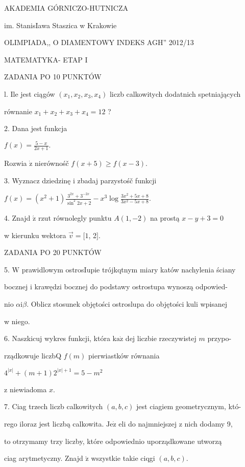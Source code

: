 \documentclass[a4paper,12pt]{article}
\begin{document}
AKADEMIA GÓRNICZO-HUTNICZA

im. StanisIawa Staszica w Krakowie

OLIMPIADA,, O DIAMENTOWY INDEKS AGH'' 2012/13

MATEMATYKA- ETAP I

ZADANIA PO 10 PUNKTÓW

l. Ile jest ciągów $(x_{1},x_{2},x_{3},x_{4})$ liczb calkowitych dodatnich spetniających

równanie $x_{1}+x_{2}+x_{3}+x_{4}=12$ ?

2. Dana jest funkcja

$f(x)=\displaystyle \frac{5-x}{2x+1}.$

Rozwia $\dot{\mathrm{z}}$ nierównośč $f(x+5)\geq f(x-3).$

3. Wyznacz dziedzinę i zbadaj parzystośč funkcji

$f(x)=(x^{2}+1)\displaystyle \frac{3^{2x}+3^{-2x}}{\sin^{2}2x+2}-x^{3}\log\frac{3x^{2}+5x+8}{3x^{2}-5x+8}.$

4. Znajd $\acute{\mathrm{z}}$ rzut równolegly punktu $A(1,-2)$ na prostą $x-y+3 = 0$

w kierunku wektora $\vec{v}=[1$, 2$].$

ZADANIA PO 20 PUNKTÓW

5. $\mathrm{W}$ prawidlowym ostrosIupie trójkqtnym miary katów nachylenia ściany

bocznej i krawędzi bocznej do podstawy ostrostupa wynoszą odpowied-

nio $\alpha \mathrm{i}\beta$. Oblicz stosunek objętości ostroslupa do objętości kuli wpisanej

w niego.

6. Naszkicuj wykres funkcji, która $\mathrm{k}\mathrm{a}\dot{\mathrm{z}}$ dej liczbie rzeczywistej $m$ przypo-

rządkowuje liczbQ $f(m)$ pierwiastków równania

$4^{|x|}+(m+1)2^{|x|+1}=5-m^{2}$

z niewiadoma $x.$

7. Ciag trzech liczb calkowitych $(a,b,c)$ jest ciagiem geometrycznym, któ-

rego iloraz jest liczbą calkowita. $\mathrm{J}\mathrm{e}\dot{\mathrm{z}}$ eli do najmniejszej z nich dodamy 9,

to otrzymamy trzy liczby, które odpowiednio uporządkowane utworzą

ciag arytmetyczny. Znajd $\acute{\mathrm{z}}$ wszystkie takie ciqgi $(a,b,c).$
\end{document}
